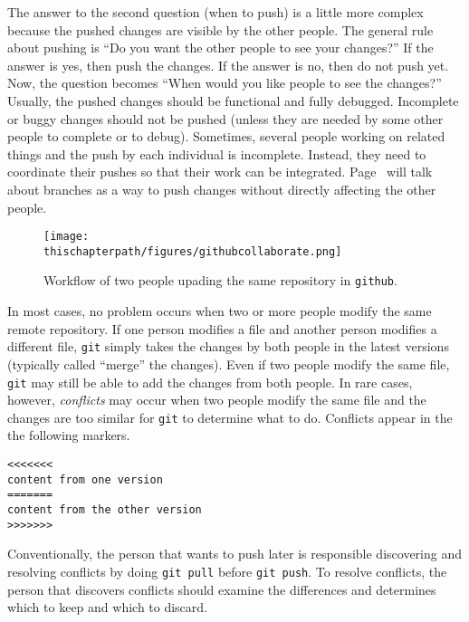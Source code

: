 \label{page:whengitpush}
The answer to the second question (when to push) is a little more
complex because the pushed changes are visible by the other people.
The general rule about pushing is ``Do you want the other people to
see your changes?''  If the answer is yes, then push the changes.  If
the answer is no, then do not push yet.  Now, the question becomes
``When would you like people to see the changes?''  Usually, the
pushed changes should be functional and fully debugged.  Incomplete or
buggy changes should not be pushed (unless they are needed by some
other people to complete or to debug).  Sometimes, several people
working on related things and the push by each individual is
incomplete. Instead, they need to coordinate their pushes so that
their work can be integrated.
Page~\pageref{section:git:branches} will talk about branches as a way
to push changes without directly affecting the other people.

\begin{figure}[h] \centering
{\texttt{[image: \\thischapterpath/figures/githubcollaborate.png]}}
\caption{Workflow of two people upading the same repository in {\tt github}.}
\label{fig:githubcollaborate}
\end{figure}

In most cases, no problem occurs when two or more people modify the
same remote repository. If one person modifies a file and another
person modifies a different file, {\tt git} simply takes the changes
by both people in the latest versions (typically called ``merge'' the
changes).  Even if two people modify the same file, {\tt git} may
still be able to add the changes from both people.  In rare cases,
however, {\it conflicts} may occur when two people modify the same
file and the changes are too similar for {\tt git} to determine what
to do.  Conflicts appear in the the following markers.


\begin{verbatim}
<<<<<<< 
content from one version
=======
content from the other version
>>>>>>> 
\end{verbatim}


Conventionally, the person that wants to push later is responsible
discovering and resolving conflicts by doing {\tt git pull} before
{\tt git push}.  To resolve conflicts, the person that discovers
conflicts should examine the differences and determines which to keep
and which to discard.

